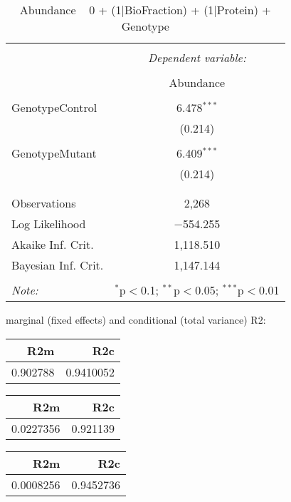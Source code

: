 \documentclass[11pt]{report}
\begin{document}
\begin{table}[!htbp] \centering 
  \caption{Abundance ~ 0 + (1|BioFraction) + (1|Protein) + Genotype} 
  \label{} 
\begin{tabular}{@{\extracolsep{5pt}}lc} 
\\[-1.8ex]\hline 
\hline \\[-1.8ex] 
 & \multicolumn{1}{c}{\textit{Dependent variable:}} \\ 
\cline{2-2} 
\\[-1.8ex] & Abundance \\ 
\hline \\[-1.8ex] 
 GenotypeControl & 6.478$^{***}$ \\ 
  & (0.214) \\ 
  & \\ 
 GenotypeMutant & 6.409$^{***}$ \\ 
  & (0.214) \\ 
  & \\ 
\hline \\[-1.8ex] 
Observations & 2,268 \\ 
Log Likelihood & $-$554.255 \\ 
Akaike Inf. Crit. & 1,118.510 \\ 
Bayesian Inf. Crit. & 1,147.144 \\ 
\hline 
\hline \\[-1.8ex] 
\textit{Note:}  & \multicolumn{1}{r}{$^{*}$p$<$0.1; $^{**}$p$<$0.05; $^{***}$p$<$0.01} \\ 
\end{tabular} 
\end{table} 
marginal (fixed effects) and conditional (total variance) R2:

\begin{tabular}{r|r}
\hline
R2m & R2c\\
\hline
0.902788 & 0.9410052\\
\hline
\end{tabular}

\begin{tabular}{r|r}
\hline
R2m & R2c\\
\hline
0.0227356 & 0.921139\\
\hline
\end{tabular}

\begin{tabular}{r|r}
\hline
R2m & R2c\\
\hline
0.0008256 & 0.9452736\\
\hline
\end{tabular}
\end{document}
